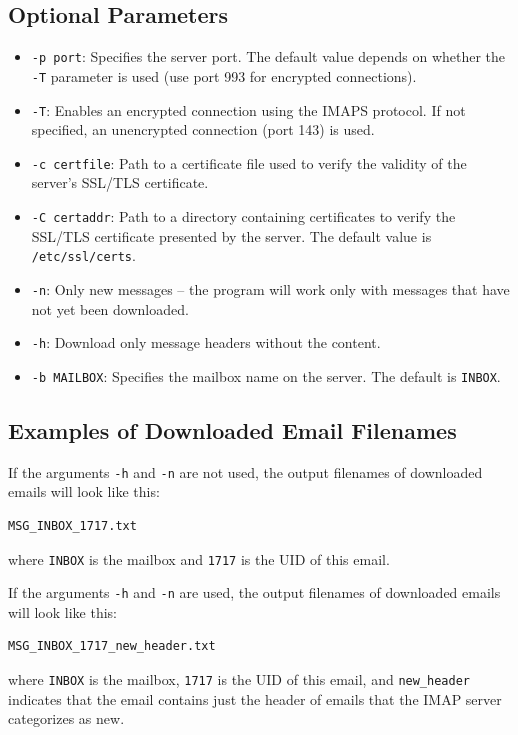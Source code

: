 \documentclass[a4paper,11pt]{article}
\begin{document}
\subsection{Optional Parameters}
\begin{itemize}
    \item \texttt{-p port}: Specifies the server port. The default value depends on whether the \texttt{-T} parameter is used (use port 993 for encrypted connections).
    \item \texttt{-T}: Enables an encrypted connection using the IMAPS protocol. If not specified, an unencrypted connection (port 143) is used.
    \item \texttt{-c certfile}: Path to a certificate file used to verify the validity of the server’s SSL/TLS certificate.
    \item \texttt{-C certaddr}: Path to a directory containing certificates to verify the SSL/TLS certificate presented by the server. The default value is \texttt{/etc/ssl/certs}.
    \item \texttt{-n}: Only new messages – the program will work only with messages that have not yet been downloaded.
    \item \texttt{-h}: Download only message headers without the content.
    \item \texttt{-b MAILBOX}: Specifies the mailbox name on the server. The default is \texttt{INBOX}.
\end{itemize}


\subsection{Examples of Downloaded Email Filenames}
If the arguments \texttt{-h} and \texttt{-n} are not used, the output filenames of downloaded emails will look like this:
\begin{verbatim}
MSG_INBOX_1717.txt
\end{verbatim}
where \texttt{INBOX} is the mailbox and \texttt{1717} is the UID of this email.

If the arguments \texttt{-h} and \texttt{-n} are used, the output filenames of downloaded emails will look like this:
\begin{verbatim}
MSG_INBOX_1717_new_header.txt
\end{verbatim}
where \texttt{INBOX} is the mailbox, \texttt{1717} is the UID of this email, and \texttt{new\_header} indicates that the email contains just the header of emails that the IMAP server categorizes as new.
\end{document}

